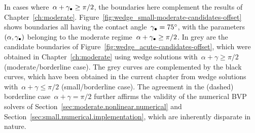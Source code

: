 In cases where~$\alpha + \gamma_\bullet \ge \pi/2$,
the boundaries here
complement the results of Chapter~\ref{ch:moderate}.
Figure~\ref{fig:wedge_small-moderate-candidates-offset} shows boundaries
all having the contact angle~$\gamma_\bullet = \SI{75}{\degree}$,
with the parameters~$(\alpha, \gamma_\bullet)$
belonging to the moderate regime~$\alpha + \gamma_\bullet \ge \pi/2$.
In grey are the candidate boundaries
of Figure~\ref{fig:wedge_acute-candidates-offset},
which were obtained in Chapter~\ref{ch:moderate}
using wedge solutions with~$\alpha + \gamma \ge \pi/2$
(moderate/borderline case).
The grey curves are complemented by the black curves,
which have been obtained in the current chapter
from wedge solutions with~$\alpha + \gamma \le \pi/2$
(small/borderline case).
The agreement in the (dashed) borderline case~$\alpha + \gamma = \pi/2$
further affirms the validity of the numerical BVP solvers
of Section~\ref{sec:moderate.nonlinear.numerical}
and Section~\ref{sec:small.numerical.implementation},
which are inherently disparate in nature.

